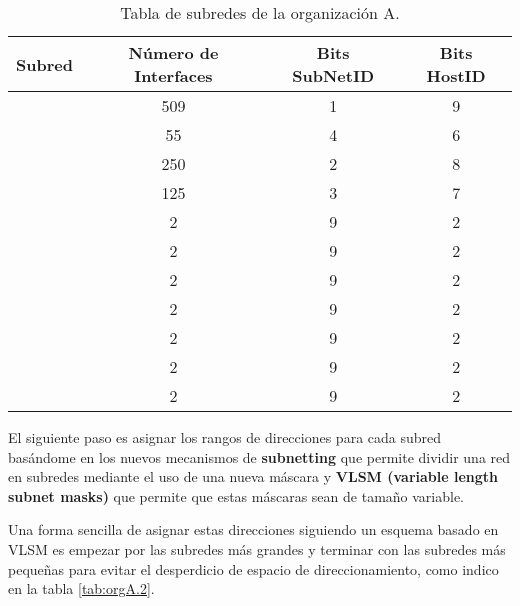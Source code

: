 \begin{table}[H]
    \centering
    \begin{tabular}{|c|c|c|c|}
        \hline
       	Subred&Número de Interfaces&Bits SubNetID&Bits HostID\\\hline
	\cellcolor{azul}{LAN1.0}&509&1&9 \\ \hline
	\cellcolor{naranja}{LAN1.1}&55&4&6 \\ \hline
	\cellcolor{lila}{LAN1.2}&250&2&8 \\ \hline
	\cellcolor{rosa}{LAN1.3}&125&3&7 \\ \hline
	\cellcolor{verde}{P2P1.0}&2&9&2 \\ \hline
	\cellcolor{verde}{P2P1.1}&2&9&2 \\ \hline
	\cellcolor{verde}{P2P1.2}&2&9&2 \\ \hline
	\cellcolor{verde}{P2P1.3}&2&9&2 \\ \hline
	\cellcolor{verde}{P2P1.4}&2&9&2 \\ \hline
	\cellcolor{verde}{P2P1.5}&2&9&2 \\ \hline
	\cellcolor{verde}{P2P1.6}&2&9&2 \\ \hline
    \end{tabular}
    \caption{Tabla de subredes de la organización A.}
    \label{tab:orgA.1}
\end{table}
\par El siguiente paso es asignar los rangos de direcciones para cada subred basándome en los nuevos mecanismos de \textbf{subnetting} que permite dividir una red en subredes mediante el uso de una nueva máscara y \textbf{VLSM (variable length subnet masks)} que permite que estas máscaras sean de tamaño variable.
\par Una forma sencilla de asignar estas direcciones siguiendo un esquema basado en VLSM es empezar por las subredes más grandes y terminar con las subredes más pequeñas para evitar el desperdicio de espacio de direccionamiento, como indico en la tabla \ref{tab:orgA.2}. 

